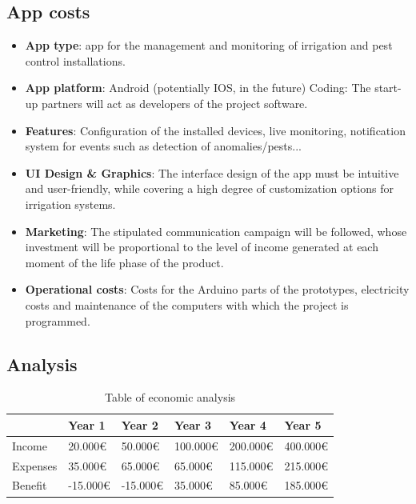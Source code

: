 \documentclass[11pt,a4paper]{article}
\begin{document}
\subsection{App costs}
\begin{itemize}
\item \textbf{App type}: app for the management and monitoring of irrigation and pest control installations. 
\item \textbf{App platform}: Android (potentially IOS, in the future)
Coding: The start-up partners will act as developers of the project software. 
\item \textbf{Features}: Configuration of the installed devices, live monitoring, notification system for events such as detection of anomalies/pests...
\item \textbf{UI Design \& Graphics}: The interface design of the app must be intuitive and user-friendly, while covering a high degree of customization options for irrigation systems. 
\item \textbf{Marketing}: The stipulated communication campaign will be followed, whose investment will be proportional to the level of income generated at each moment of the life phase of the product. 
\item \textbf{Operational costs}: Costs for the Arduino parts of the prototypes, electricity costs and maintenance of the computers with which the project is programmed. 
\end{itemize}

\subsection{Analysis}
\begin{table}[htbp]
\centering
\begin{tabular}{|l||l|l|l|l|l|}
\hline
\textbf{} & \textbf{Year 1} & \textbf{Year 2} & \textbf{Year 3} & \textbf{Year 4} & \textbf{Year 5} \\ \hline \hline
Income & 20.000\euro{} & 50.000\euro{} & 100.000\euro{} & 200.000\euro{} & 400.000\euro{} \\ \hline
Expenses & 35.000\euro{} & 65.000\euro{} & 65.000\euro{} & 115.000\euro{} & 215.000\euro{} \\ \hline
Benefit & -15.000\euro{} & -15.000\euro{} & 35.000\euro{} & 85.000\euro{} & 185.000\euro{} \\ \hline
\end{tabular}
\caption{Table of economic analysis}
\end{table}
\end{document}
